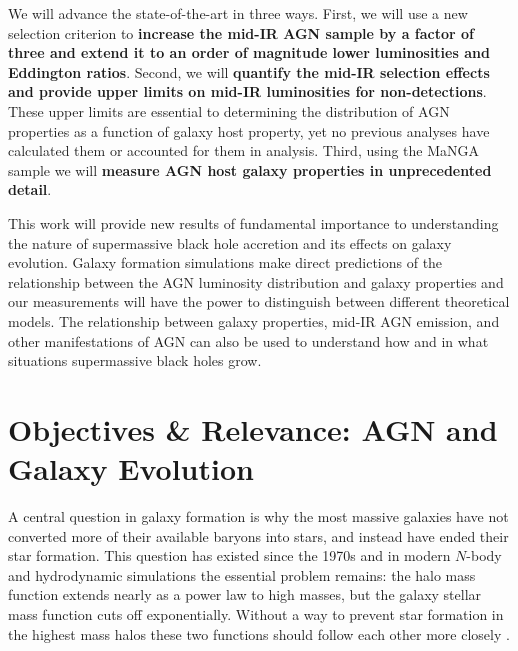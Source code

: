 \documentclass[12pt, preprint]{hacked-aastex}
\begin{document}
We will advance the state-of-the-art in three ways. First, we will use
a new selection criterion to {\bf increase the mid-IR AGN sample by a
  factor of three and extend it to an order of magnitude lower
  luminosities and Eddington ratios}.  Second, we will {\bf quantify
  the mid-IR selection effects and provide upper limits on mid-IR
  luminosities for non-detections}. These upper limits are essential
to determining the distribution of AGN properties as a function of
galaxy host property, yet no previous analyses have calculated them or
accounted for them in analysis.  Third, using the MaNGA sample we will
{\bf measure AGN host galaxy properties in unprecedented detail}.

This work will provide new results of fundamental importance to
understanding the nature of supermassive black hole accretion and its
effects on galaxy evolution.  Galaxy formation simulations make direct
predictions of the relationship between the AGN luminosity
distribution and galaxy properties and our measurements will have the
power to distinguish between different theoretical models. The
relationship between galaxy properties, mid-IR AGN emission, and other
manifestations of AGN can also be used to understand how and in what
situations supermassive black holes grow.

\section{Objectives \& Relevance: AGN and Galaxy Evolution}\label{sec:objectives}


A central question in galaxy formation is why the most massive
galaxies have not converted more of their available baryons into
stars, and instead have ended their star formation. This question has
existed since the 1970s \cite{white78a} and in modern $N$-body and
hydrodynamic simulations the essential problem remains: the halo mass
function extends nearly as a power law to high masses, but the galaxy
stellar mass function cuts off exponentially.  Without a way to
prevent star formation in the highest mass halos these two functions
should follow each other more closely \cite{benson03a, somerville15a}.
\end{document}
